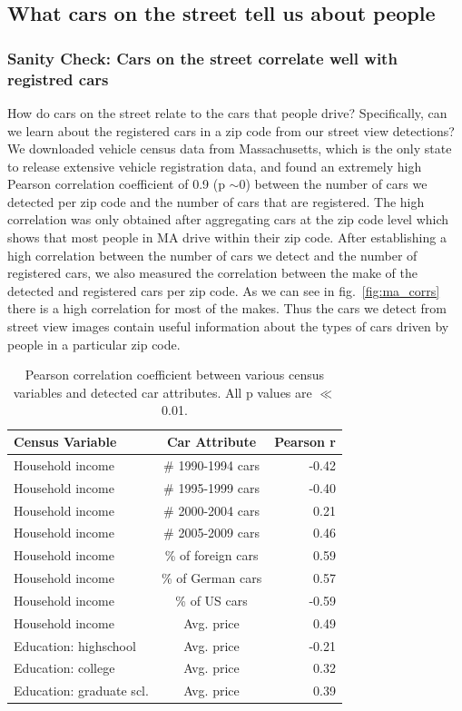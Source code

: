 \documentclass[10pt,twocolumn,letterpaper]{article}
\begin{document}
\subsection{What cars on the street tell us about people}
\subsubsection{Sanity Check: Cars on the street correlate well with registred cars}
How do cars on the street relate to the cars that people drive? Specifically, can we learn about the registered cars in a zip code from our street view detections?
We downloaded vehicle census data from Massachusetts, which is the only state to release extensive vehicle registration data, and found an extremely high Pearson correlation coefficient of 0.9 (p \(\sim\)0) between the number of cars we detected per zip code and the number of cars that are registered. The high correlation was only obtained after aggregating cars at the zip code level which shows that most people in MA drive within their zip code. 
After establishing a high correlation between the number of cars we detect and the number of registered cars, we also measured the correlation between the make of the detected and registered cars per zip code. As we can see in fig.~\ref{fig:ma_corrs} there is a high correlation for most of the makes. Thus the cars we detect from street view images contain useful information about the types of cars driven by people in a particular zip code.

\begin{table}
\begin{center}
\begin{tabular}{|l|c|r|}
\hline
\textbf{Census Variable} & \textbf{Car Attribute} & \textbf{Pearson r}  \\
\hline\hline
Household income & \# 1990-1994 cars & -0.42 \\
Household income & \# 1995-1999 cars & -0.40 \\
Household income & \# 2000-2004 cars & 0.21 \\
Household income & \# 2005-2009 cars & 0.46 \\
Household income & \% of foreign cars & 0.59 \\
Household income & \% of German cars & 0.57 \\
Household income & \% of US cars & -0.59 \\
Household income & Avg. price & 0.49 \\
Education: highschool & Avg. price & -0.21 \\
Education: college & Avg. price & 0.32 \\
Education: graduate scl. & Avg. price & 0.39 \\
\hline
\end{tabular}
\end{center}
\caption{Pearson correlation coefficient between various census variables and detected car attributes. All p values are \(\ll\) 0.01.}
\label{table:car-census-corrs}
\end{table}
\end{document}
